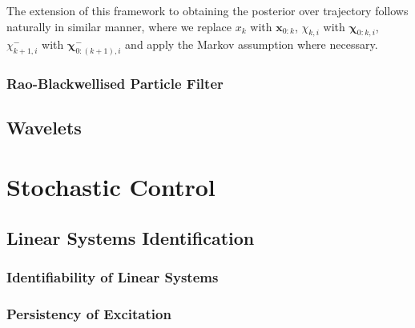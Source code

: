 \documentclass[11pt]{report} %
\begin{document}
The extension of this framework to obtaining the posterior over trajectory follows naturally in similar manner, where we replace $x_{k}$ with $\mathbf{x}_{0:k}$, $\chi_{k, i}$ with $\boldsymbol{\chi}_{0:k, i}$, $\chi_{k + 1, i}^{-}$ with $\boldsymbol{\chi}_{0:\left(k + 1\right), i}^{-}$ and apply the Markov assumption where necessary.

\subsection{Rao-Blackwellised Particle Filter}

\section{Wavelets}

\chapter{Stochastic Control}

\section{Linear Systems Identification}

\subsection{Identifiability of Linear Systems}

\subsection{Persistency of Excitation \cite{Verhaegen2007}}
\end{document}
